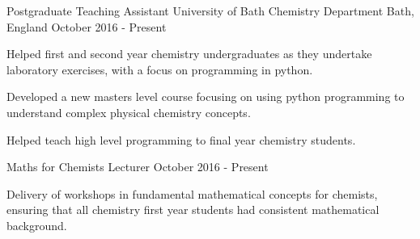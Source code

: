 \begin{cventries}
    \cventry
    {Postgraduate Teaching Assistant}
	{University of Bath Chemistry Department}    
    {Bath, England}
    {October 2016 - Present}
    {
      \begin{cvitems}
        \item{Helped first and second year chemistry undergraduates as they undertake laboratory exercises, with a focus on programming in python.}
        \item{Developed a new masters level course focusing on using python programming to understand complex physical chemistry concepts.}
        \item{Helped teach high level programming to final year chemistry students.}
      \end{cvitems}
    }

	\cventry   
    {Maths for Chemists Lecturer}
    {}
    {}
    {October 2016 - Present}
    {
      \begin{cvitems}
        \item
        {Delivery of workshops in fundamental mathematical concepts for chemists, ensuring that all chemistry first year students had consistent
mathematical background.} 
      \end{cvitems}
    }
\end{cventries}